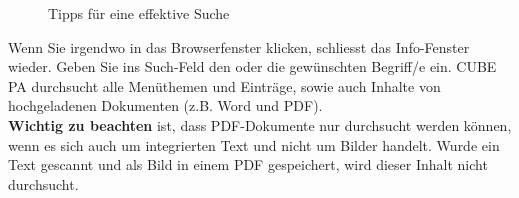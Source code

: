 \begin{figure}[H]
\caption{Tipps für eine effektive Suche}
\end{figure}

Wenn Sie irgendwo in das Browserfenster klicken, schliesst das Info-Fenster wieder. Geben Sie ins Such-Feld  den oder die gewünschten Begriff/e ein. CUBE PA durchsucht alle Menüthemen und Einträge, sowie auch Inhalte von hochgeladenen Dokumenten (z.B. Word und PDF). \\

\textbf{Wichtig zu beachten} ist, dass PDF-Dokumente nur durchsucht werden können, wenn es sich auch um integrierten Text und nicht um Bilder handelt. Wurde ein Text gescannt und als Bild in einem PDF gespeichert, wird dieser Inhalt nicht durchsucht.\\


